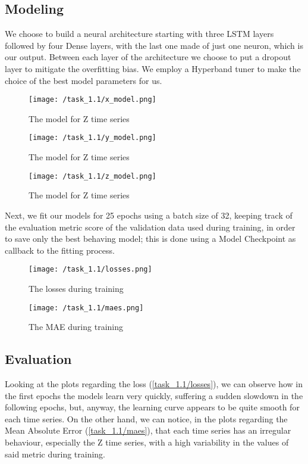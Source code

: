\documentclass[12pt,a4paper,leqno]{article}
\begin{document}
	\subsection{Modeling}
	We choose to build a neural architecture starting with three LSTM layers followed by four Dense layers, with the last one made of just one neuron, which is our output. Between each layer of the architecture we choose to put a dropout layer to mitigate the overfitting bias. We employ a Hyperband tuner to make the choice of the best model parameters for us.
	\begin{figure}
		\centering
		\texttt{[image: /task\_1.1/x\_model.png]}
		\caption{The model for Z time series}
		\label{task_1.1/x_model}
	\end{figure}
	\begin{figure}
		\centering
		\texttt{[image: /task\_1.1/y\_model.png]}
		\caption{The model for Z time series}
		\label{task_1.1/y_model}
	\end{figure}
	\begin{figure}
		\centering
		\texttt{[image: /task\_1.1/z\_model.png]}
		\caption{The model for Z time series}
		\label{task_1.1/z_model}
	\end{figure}
	Next, we fit our models for 25 epochs using a batch size of 32, keeping track of the evaluation metric score of the validation data used during training, in order to save only the best behaving model; this is done using a Model Checkpoint as callback to the fitting process.
	\begin{figure}[h]
		\centering
		\texttt{[image: /task\_1.1/losses.png]}
		\caption{The losses during training}
		\label{task_1.1/losses}
	\end{figure}
	\begin{figure}[h]
		\centering
		\texttt{[image: /task\_1.1/maes.png]}
		\caption{The MAE during training}
		\label{task_1.1/maes}
	\end{figure}
	
	\subsection{Evaluation}
	Looking at the plots regarding the loss (\autoref{task_1.1/losses}), we can observe how in the first epochs the models learn very quickly, suffering a sudden slowdown in the following epochs, but, anyway, the learning curve appears to be quite smooth for each time series. On the other hand, we can notice, in the plots regarding the Mean Absolute Error (\autoref{task_1.1/maes}), that each time series has an irregular behaviour, especially the Z time series, with a high variability in the values of said metric during training.
	
\end{document}
